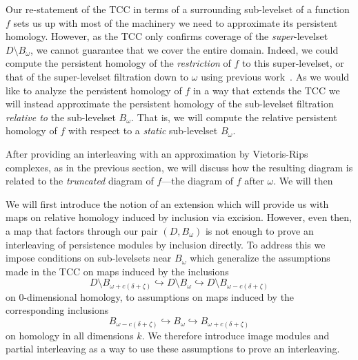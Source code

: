 
Our re-statement of the TCC in terms of a surrounding sub-levelset of a function $f$ sets us up with most of the machinery we need to approximate its persistent homology.
However, as the TCC only confirms coverage of the \emph{super}-levelset $D\setminus B_\omega$, we cannot guarantee that we cover the entire domain.
Indeed, we could compute the persistent homology of the \emph{restriction} of $f$ to this super-levelset, or that of the super-levelset filtration down to $\omega$ using previous work~\cite{chazal09analysis}.
As we would like to analyze the persistent homology of $f$ in a way that extends the TCC we will instead approximate the persistent homology of the sub-levelset filtration \emph{relative to} the sub-levelset $B_\omega$.
That is, we will compute the relative persistent homology of $f$ with respect to a \emph{static} sub-levelset $B_\omega$.

After providing an interleaving with an approximation by Vietoris-Rips complexes, as in the previous section, we will discuss how the resulting diagram is related to the \emph{truncated} diagram of $f$---the diagram of $f$ after $\omega$.
We will then


We will first introduce the notion of an extension which will provide us with maps on relative homology induced by inclusion via excision.
However, even then, a map that factors through our pair $(D, B_\omega)$ is not enough to prove an interleaving of persistence modules by inclusion directly.
To address this we impose conditions on sub-levelsets near $B_\omega$ which generalize the assumptions made in the TCC on maps induced by the inclusions
\[ D\setminus B_{\omega+c(\delta+\zeta)}\hookrightarrow D\setminus B_\omega\hookrightarrow D\setminus B_{\omega-c(\delta+\zeta)}\]
on $0$-dimensional homology, to assumptions on maps induced by the corresponding inclusions
\[ B_{\omega-c(\delta+\zeta)}\hookrightarrow B_\omega\hookrightarrow B_{\omega+c(\delta+\zeta)}\]
on homology in all dimensions $k$.
We therefore introduce image modules and partial interleaving as a way to use these assumptions to prove an interleaving.

